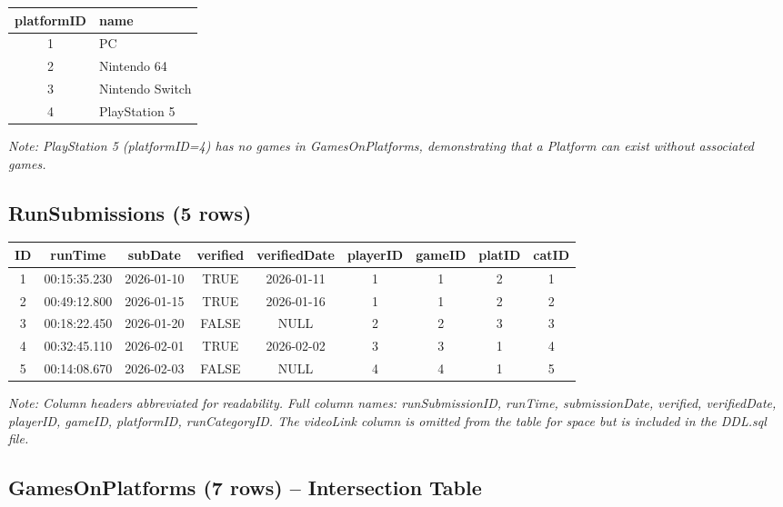 \documentclass[11pt]{article}
\begin{document}
\begin{center}
\begin{tabular}{cl}
\toprule
\textbf{platformID} & \textbf{name} \\
\midrule
1 & PC \\
2 & Nintendo 64 \\
3 & Nintendo Switch \\
4 & PlayStation 5 \\
\bottomrule
\end{tabular}
\end{center}

\textit{Note: PlayStation 5 (platformID=4) has no games in GamesOnPlatforms, demonstrating that a Platform can exist without associated games.}

\subsection*{RunSubmissions (5 rows)}

\begin{center}
\small
\begin{tabular}{ccccccccc}
\toprule
\textbf{ID} & \textbf{runTime} & \textbf{subDate} & \textbf{verified} & \textbf{verifiedDate} & \textbf{playerID} & \textbf{gameID} & \textbf{platID} & \textbf{catID} \\
\midrule
1 & 00:15:35.230 & 2026-01-10 & TRUE & 2026-01-11 & 1 & 1 & 2 & 1 \\
2 & 00:49:12.800 & 2026-01-15 & TRUE & 2026-01-16 & 1 & 1 & 2 & 2 \\
3 & 00:18:22.450 & 2026-01-20 & FALSE & NULL & 2 & 2 & 3 & 3 \\
4 & 00:32:45.110 & 2026-02-01 & TRUE & 2026-02-02 & 3 & 3 & 1 & 4 \\
5 & 00:14:08.670 & 2026-02-03 & FALSE & NULL & 4 & 4 & 1 & 5 \\
\bottomrule
\end{tabular}
\end{center}

\textit{Note: Column headers abbreviated for readability. Full column names: runSubmissionID, runTime, submissionDate, verified, verifiedDate, playerID, gameID, platformID, runCategoryID. The videoLink column is omitted from the table for space but is included in the DDL.sql file.}

\subsection*{GamesOnPlatforms (7 rows) -- Intersection Table}
\end{document}
